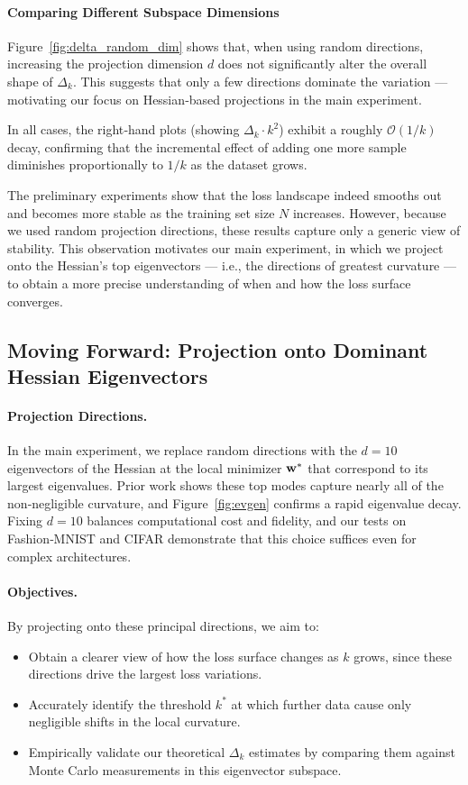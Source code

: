\documentclass{article}
\begin{document}
\paragraph{Comparing Different Subspace Dimensions}
Figure~\ref{fig:delta_random_dim} shows that, when using random directions, increasing the projection dimension $d$ does not
significantly alter the overall shape of $\Delta_k$. This suggests that only a few directions dominate the variation --- motivating our
focus on Hessian‐based projections in the main experiment.

In all cases, the right‐hand plots (showing $\Delta_k \cdot k^2$) exhibit a roughly $\mathcal O(1 / k)$ decay, confirming that the
incremental effect of adding one more sample diminishes proportionally to $1 / k$ as the dataset grows.

The preliminary experiments show that the loss landscape indeed smooths out and becomes more stable as the training set size $N$
increases. However, because we used random projection directions, these results capture only a generic view of stability. This
observation motivates our main experiment, in which we project onto the Hessian’s top eigenvectors --- i.e., the directions of greatest
curvature --- to obtain a more precise understanding of when and how the loss surface converges.

\subsection{Moving Forward: Projection onto Dominant Hessian Eigenvectors}

\paragraph{Projection Directions.}
In the main experiment, we replace random directions with the $d=10$ eigenvectors of the Hessian at the local minimizer $\mathbf{w}^*$ that
correspond to its largest eigenvalues.  Prior work \cite{sagun2018empirical} shows these top modes capture nearly all of the
non‑negligible curvature, and Figure~\ref{fig:evgen} confirms a rapid eigenvalue decay. Fixing $d=10$ balances computational cost and
fidelity, and our tests on Fashion‑MNIST and CIFAR demonstrate that this choice suffices even for complex architectures.

\paragraph{Objectives.}
By projecting onto these principal directions, we aim to:
\begin{itemize}
  \item Obtain a clearer view of how the loss surface changes as $k$ grows, since these directions drive the largest loss variations.
  \item Accurately identify the threshold $k^*$ at which further data cause only negligible shifts in the local curvature.
  \item Empirically validate our theoretical $\Delta_k$ estimates by comparing them against Monte Carlo measurements in this eigenvector
        subspace.
\end{itemize}
\end{document}
